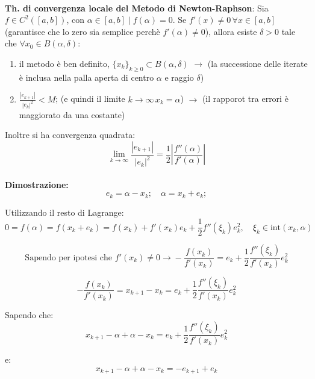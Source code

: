 \documentclass[a4paper, 11pt]{article}
\begin{document}
        \paragraph{}
        \textbf{Th. di convergenza locale del Metodo di Newton-Raphson}: Sia \( f \in C^2([a,b]) \), con \( \alpha \in [a,b] \mid f(\alpha) = 0 \).
        Se \( f'(x) \neq 0 \, \forall x \in [a,b] \) (garantisce che lo zero sia semplice perchè $f'(\alpha) \neq 0$), allora esiste \( \delta > 0 \) tale che \( \forall x_0 \in B(\alpha, \delta) \):

        \begin{enumerate}
            \item il metodo è ben definito, \( \{x_k\}_{k \geq 0} \subset B(\alpha, \delta) \) $\rightarrow$ (la successione delle iterate è inclusa nella palla aperta di centro $\alpha$ e raggio $\delta$) 
            \item \( \frac{|e_{k+1}|}{|e_k|^2} < M \); (e quindi il limite \( k \to \infty \, x_k = \alpha \)) $\rightarrow$ (il rapporot tra errori è maggiorato da una costante) 
        \end{enumerate}

        Inoltre si ha convergenza quadrata:
        \[
            \lim_{k \to \infty} \frac{|e_{k+1}|}{|e_k|^2} = \frac{1}{2} \left| \frac{f''(\alpha)}{f'(\alpha)} \right|
        \]

        \paragraph{}
        \textbf{Dimostrazione: }
        \[
        e_k = \alpha - x_k; \quad \alpha = x_k + e_k;
        \]

        Utilizzando il resto di Lagrange: 
        \[
        0 = f(\alpha) = f(x_k + e_k) = f(x_k) + f'(x_k) e_k + \frac{1}{2} f''(\xi_k)e_k^2, \quad \xi_k \in \text{int}(x_k,\alpha)
        \]

        
        \[
            \text{Sapendo per ipotesi che $f'(x_k) \neq 0 \rightarrow$}-\frac{f(x_k)}{f'(x_k)} = e_k + \frac{1}{2} \frac{f''(\xi_k)}{f'(x_k)} e_k^2
        \]

        \[
            -\frac{f(x_k)}{f'(x_k)} = x_{k+1} - x_k =  e_k + \frac{1}{2} \frac{f''(\xi_k)}{f'(x_k)} e_k^2
        \]

        Sapendo che:
        \[
            x_{k+1} - \alpha + \alpha - x_k = e_k + \frac{1}{2} \frac{f''(\xi_k)}{f'(x_k)} e_k^2
        \]

        e:
        \[
            x_{k+1} - \alpha + \alpha - x_k = - e_{k+1} + e_k
        \]
\end{document}
